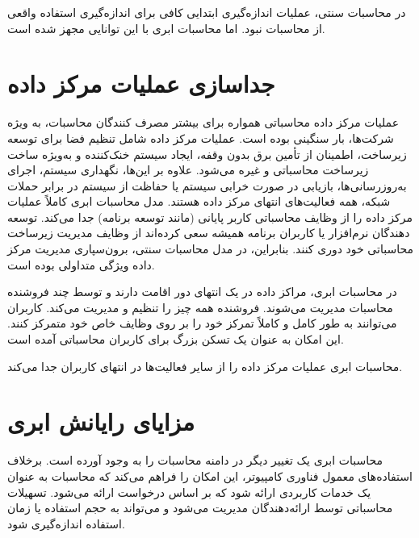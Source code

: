 \documentclass{book}
\begin{document}
            \begin{addinfo}
                
                در محاسبات سنتی، عملیات اندازه‌گیری ابتدایی کافی برای اندازه‌گیری استفاده واقعی از محاسبات نبود. اما محاسبات ابری با این توانایی مجهز شده است.

            \end{addinfo}

        \section{جداسازی عملیات مرکز داده}

            عملیات مرکز داده محاسباتی همواره برای بیشتر مصرف کنندگان محاسبات، به ویژه شرکت‌ها، بار سنگینی بوده است. عملیات مرکز داده شامل تنظیم فضا برای توسعه زیرساخت، اطمینان از تأمین برق بدون وقفه، ایجاد سیستم خنک‌کننده و به‌ویژه ساخت زیرساخت محاسباتی و غیره می‌شود. علاوه بر این‌ها، نگهداری سیستم، اجرای به‌روزرسانی‌ها، بازیابی در صورت خرابی سیستم یا حفاظت از سیستم در برابر حملات شبکه، همه فعالیت‌های انتهای مرکز داده هستند. مدل محاسبات ابری کاملاً عملیات مرکز داده را از وظایف محاسباتی کاربر پایانی (مانند توسعه برنامه) جدا می‌کند. توسعه دهندگان نرم‌افزار یا کاربران برنامه همیشه سعی کرده‌اند از وظایف مدیریت زیرساخت محاسباتی خود دوری کنند. بنابراین، در مدل محاسبات سنتی، برون‌سپاری مدیریت مرکز داده ویژگی متداولی بوده است.

            در محاسبات ابری، مراکز داده در یک انتهای دور اقامت دارند و توسط چند فروشنده محاسبات مدیریت می‌شوند. فروشنده همه چیز را تنظیم و مدیریت می‌کند. کاربران می‌توانند به طور کامل و کاملاً تمرکز خود را بر روی وظایف خاص خود متمرکز کنند. این امکان به عنوان یک تسکن بزرگ برای کاربران محاسباتی آمده است.

            \begin{addinfo}
                
                محاسبات ابری عملیات مرکز داده را از سایر فعالیت‌ها در انتهای کاربران جدا می‌کند.

            \end{addinfo}

        \section{مزایای رایانش ابری}

            محاسبات ابری یک تغییر دیگر در دامنه محاسبات را به وجود آورده است. برخلاف استفاده‌های معمول فناوری کامپیوتر، این امکان را فراهم می‌کند که محاسبات به عنوان یک خدمات کاربردی ارائه شود که بر اساس درخواست ارائه می‌شود. تسهیلات محاسباتی توسط ارائه‌دهندگان مدیریت می‌شود و می‌تواند به حجم استفاده یا زمان استفاده اندازه‌گیری شود.
\end{document}
